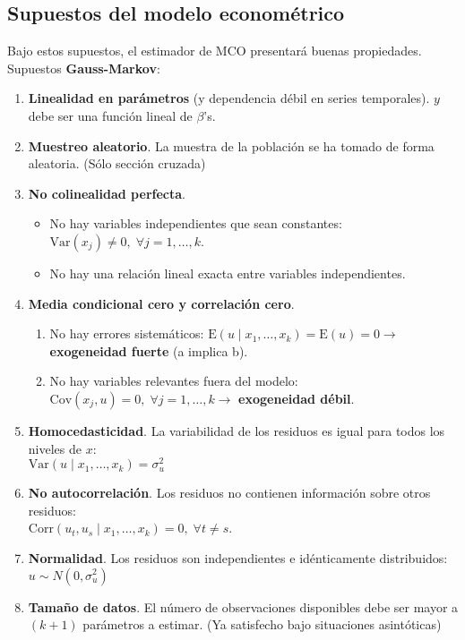 \documentclass[10pt, a4paper, landscape]{extarticle}
\newcommand{\E}{\mathrm{E}}
\newcommand{\Var}{\mathrm{Var}}
\newcommand{\Cov}{\mathrm{Cov}}
\newcommand{\Corr}{\mathrm{Corr}}
\begin{document}
\begin{multicols}{3}
\subsection*{Supuestos del modelo econométrico}

Bajo estos supuestos, el estimador de MCO presentará buenas propiedades. Supuestos \textbf{Gauss-Markov}:

\begin{enumerate}[leftmargin=*]
	\item \textbf{Linealidad en parámetros} (y dependencia débil en series temporales). $y$ debe ser una función lineal de $\beta$'s.
	\item \textbf{Muestreo aleatorio}. La muestra de la población se ha tomado de forma aleatoria. (Sólo sección cruzada)
	\item \textbf{No colinealidad perfecta}.
	\begin{itemize}[leftmargin=*]
		\item No hay variables independientes que sean constantes: $\Var(x_j) \neq 0, \; \forall j = 1, \ldots, k$.
		\item No hay una relación lineal exacta entre variables independientes.
	\end{itemize}
	\item \textbf{Media condicional cero y correlación cero}.
	\begin{enumerate}[leftmargin=*, label=\alph*.]
		\item No hay errores sistemáticos: $\E(u \mid x_1, \ldots, x_k) = \E(u) = 0 \rightarrow$ \textbf{exogeneidad fuerte} (a implica b).
		\item No hay variables relevantes fuera del modelo: $\Cov(x_j, u) = 0, \; \forall j = 1, \ldots, k \rightarrow$ \textbf{exogeneidad débil}.
	\end{enumerate}
	\item \textbf{Homocedasticidad}. La variabilidad de los residuos es igual para todos los niveles de $x$: \\ $\Var(u \mid x_1, \ldots, x_k) = \sigma^2_u$
	\item \textbf{No autocorrelación}. Los residuos no contienen información sobre otros residuos: \\ $\Corr(u_t, u_s \mid x_1, \ldots, x_k) = 0, \; \forall t \neq s$.
	\item \textbf{Normalidad}. Los residuos son independientes e idénticamente distribuidos: $u \sim N(0, \sigma^2_u)$
	\item \textbf{Tamaño de datos}. El número de observaciones disponibles debe ser mayor a $(k + 1)$ parámetros a estimar. (Ya satisfecho bajo situaciones asintóticas)
\end{enumerate}


\end{multicols}
\end{document}
